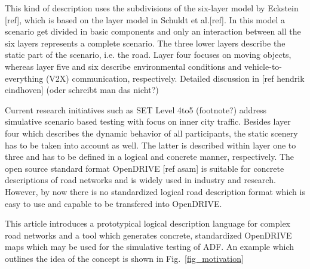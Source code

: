\documentclass[a4paper, 10pt, conference]{ieeeconf}      %
\begin{document}
This kind of description uses the subdivisions of the six-layer model by Eckstein [ref], which is based on the layer model in Schuldt et al.[ref]. In this model a scenario get divided in basic components and only an interaction between all the six layers represents a complete scenario. The three lower layers describe the static part of the scenario, i.e. the road. Layer four focuses on moving objects, whereas layer five and six describe environmental conditions and vehicle-to-everything (V2X) communication, respectively. Detailed discussion in [ref hendrik eindhoven] (oder schreibt man das nicht?)

Current research initiatives such as SET Level 4to5 (footnote?) address simulative scenario based testing with focus on inner city traffic. Besides layer four which describes the dynamic behavior of all participants, the static scenery has to be taken into account as well. The latter is described within layer one to three and has to be defined in a logical and concrete manner, respectively. The open source standard format OpenDRIVE [ref asam] is suitable for concrete descriptions of road networks and is widely used in industry and research. However, by now there is no standardized logical road description format which is easy to use and capable to be transfered into OpenDRIVE.
 
This article introduces a prototypical logical description language for complex road networks and a tool which generates concrete, standardized OpenDRIVE maps which may be used for the simulative testing of ADF. An example which outlines the idea of the concept is shown in Fig.~\ref{fig_motivation}


\end{document}
